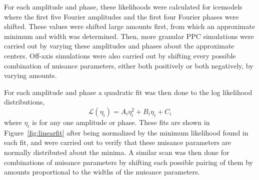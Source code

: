 \documentclass[main.tex]{subfiles}
\begin{document}
For each amplitude and phase, these likelihoods were calculated for icemodels where the first five Fourier amplitudes and the first four Fourier phases were shifted. 
These values were shifted large amounts first, from which an approximate minimum and width was determined. 
Then, more granular PPC simulations were carried out by varying these amplitudes and phases about the approximate centers. 
Off-axis simulations were also carried out by shifting every possible combination of nuisance parameters, either both positively or both negatively, by varying amounts. 


For each amplitude and phase a quadratic fit was then done to the log likelihood distributions, 
\begin{equation}
    \mathcal{L}(\eta_{i}) = A_{i}\eta_{i}^{2} + B_{i}\eta_{i} + C_{i}
\end{equation}
where $\eta_{i}$ is for any one amplitude or phase. These fits are shown in Figure~\ref{fig:linearfit} after being normalized by the minimum likelihood found in each fit, and were carried out to verify that these nuisance parameters are normally distributed about the minima. 
A similar scan was then done for combinations of nuisance parameters by shifting each possible pairing of them by amounts proportional to the widths of the nuisance parameters. 
\end{document}
